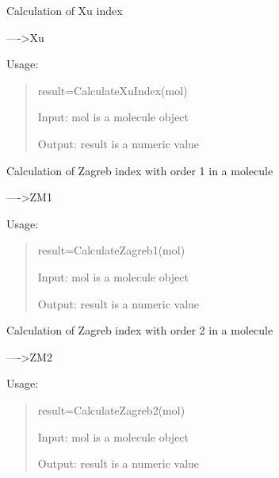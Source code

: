 \documentclass[letterpaper,10pt,english]{sphinxmanual}
\begin{document}

\begin{fulllineitems}
\label{reference/topology:topology.CalculateXuIndex}
Calculation of Xu index

----\textgreater{}Xu

Usage:
\begin{quote}

result=CalculateXuIndex(mol)

Input: mol is a molecule object

Output: result is a numeric value
\end{quote}

\end{fulllineitems}


\begin{fulllineitems}
\label{reference/topology:topology.CalculateZagreb1}
Calculation of Zagreb index with order 1 in a molecule

----\textgreater{}ZM1

Usage:
\begin{quote}

result=CalculateZagreb1(mol)

Input: mol is a molecule object

Output: result is a numeric value
\end{quote}

\end{fulllineitems}


\begin{fulllineitems}
\label{reference/topology:topology.CalculateZagreb2}
Calculation of Zagreb index with order 2 in a molecule

----\textgreater{}ZM2

Usage:
\begin{quote}

result=CalculateZagreb2(mol)

Input: mol is a molecule object

Output: result is a numeric value
\end{quote}

\end{fulllineitems}
\end{document}
